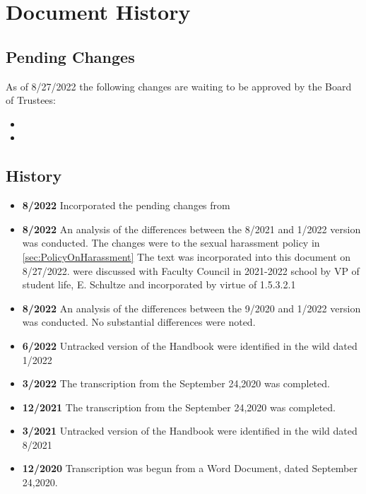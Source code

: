 \section{Document History}
	\subsection{Pending Changes}
		As of 8/27/2022 the following changes are waiting to be approved by the Board of Trustees:
		\begin{itemize}
			\item{}
			\item{}
		\end{itemize}


	\subsection{History}
		\begin{itemize}
			\item{{\bfseries 8/2022} Incorporated the pending changes from }
			\item{{\bfseries 8/2022} An analysis of the differences between the 8/2021 and 1/2022 version was conducted.
				The changes were to the sexual harassment policy in
				\ref{sec:PolicyOnHarassment}
				The text was incorporated into this document on 8/27/2022.
				were discussed with Faculty Council in 2021-2022 school by VP of student life, E. Schultze and incorporated by virtue of 1.5.3.2.1
			}
			\item{{\bfseries 8/2022} An analysis of the differences between the 9/2020 and 1/2022 version was conducted. No substantial differences were noted.}
			\item{{\bfseries 6/2022} Untracked version of the Handbook were identified in the wild dated 1/2022}
			\item{{\bfseries 3/2022} The transcription from the September 24,2020 was completed.}
			\item{{\bfseries 12/2021} The transcription from the September 24,2020 was completed.}
			\item{{\bfseries 3/2021} Untracked version of the Handbook were identified in the wild dated 8/2021}
			\item{{\bfseries 12/2020} Transcription was begun from a Word Document, dated September 24,2020.}
		\end{itemize}